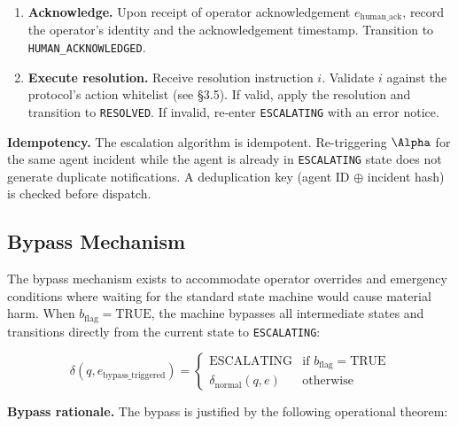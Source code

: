 \begin{algorithm}[H]
\begin{enumerate}
  \item \textbf{Acknowledge.}  Upon receipt of operator acknowledgement
    $e_\text{human\_ack}$, record the operator's identity and the acknowledgement
    timestamp.  Transition to \texttt{HUMAN\_ACKNOWLEDGED}.

  \item \textbf{Execute resolution.}  Receive resolution instruction $i$.
    Validate $i$ against the protocol's action whitelist (see \S3.5).
    If valid, apply the resolution and transition to \texttt{RESOLVED}.
    If invalid, re-enter \texttt{ESCALATING} with an error notice.
\end{enumerate}

\bigskip

\begin{note}
\textbf{Idempotency.}  The escalation algorithm is idempotent.  Re-triggering
$\Alpha$ for the same agent incident while the agent is already in
\texttt{ESCALATING} state does not generate duplicate notifications.
A deduplication key (agent ID $\oplus$ incident hash) is checked before dispatch.
\end{note}

\subsection{Bypass Mechanism}

The bypass mechanism exists to accommodate operator overrides and emergency
conditions where waiting for the standard state machine would cause material
harm.  When $b_\text{flag} = \text{TRUE}$, the machine bypasses all intermediate
states and transitions directly from the current state to \texttt{ESCALATING}:

\[
\delta(q, e_\text{bypass\_triggered}) =
\begin{cases}
\text{ESCALATING} & \text{if } b_\text{flag} = \text{TRUE} \\
\delta_\text{normal}(q, e) & \text{otherwise}
\end{cases}
\]

\bigskip

\noindent\textbf{Bypass rationale.}  The bypass is justified by the following
operational theorem:

\bigskip

\begin{samepage}
\begin{center}
\end{center}
\end{samepage}
\end{algorithm}
